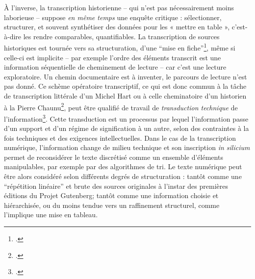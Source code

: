 À l’inverse, la transcription historienne -- qui n'est pas nécessairement moins laborieuse -- suppose \emph{en même temps} une enquête critique : sélectionner, structurer, et souvent synthétiser des données pour les « mettre en table », c’est-à-dire les rendre comparables, quantifiables. La transcription de sources historiques est tournée vers sa structuration, d'une \enquote{mise en fiche}\footcite[][]{bertfiche}, même si celle-ci est implicite -- par exemple l'ordre des éléments transcrit est une information séquentielle de cheminement de lecture -- car c'est une lecture exploratoire. Un chemin documentaire est à inventer, le parcours de lecture n'est pas donné. Ce schème opératoire transcriptif, ce qui est donc commun à la tâche de transcription littérale d'un Michel Hart ou à celle cheminatoire d'un historien à la Pierre Chaunu\footcite[][]{muller}, peut être qualifié de travail de \emph{transduction technique} de l'information\footcite[][p. 76]{chatonsky}. Cette transduction est un processus par lequel l’information passe d’un support et d’un régime de signification à un autre, selon des contraintes à la fois techniques et des exigences intellectuelles. Dans le cas de la transcription numérique, l'information change de milieu technique et son inscription \emph{in silicium} permet de reconsidérer le texte discrétisé comme un ensemble d'éléments manipulables, par exemple par des algorithmes de tri. Le texte numérique peut être alors considéré selon différents degrés de structuration : tantôt comme une \enquote{répétition linéaire} et brute des sources originales à l'instar des premières éditions du Projet Gutenberg; tantôt comme une information choisie et hiérarchisée, ou du moins tendue vers un raffinement structurel, comme l'implique une mise en tableau.

